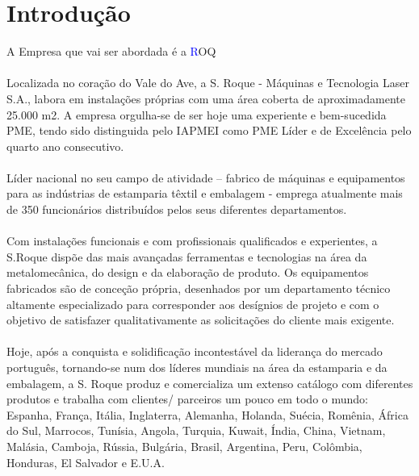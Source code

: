 \section{Introdução}
A Empresa que vai ser abordada é a {\textcolor{blue} ROQ}\\
\\
Localizada no coração do Vale do Ave, a S. Roque - Máquinas e Tecnologia Laser S.A., labora em instalações próprias com uma área coberta de aproximadamente 25.000 m2. A empresa orgulha-se de ser hoje uma experiente e bem-sucedida PME, tendo sido distinguida pelo IAPMEI como PME Líder e de Excelência pelo quarto ano consecutivo.\\\
\\
Líder nacional no seu campo de atividade – fabrico de máquinas e equipamentos para as indústrias de estamparia têxtil e embalagem - emprega atualmente mais de 350 funcionários distribuídos pelos seus diferentes departamentos.\\
\\
Com instalações funcionais e com profissionais qualificados e experientes, a S.Roque dispõe das mais avançadas ferramentas e tecnologias na área da metalomecânica, do design e da elaboração de produto. Os equipamentos fabricados são de conceção própria, desenhados por um departamento técnico altamente especializado para corresponder aos desígnios de projeto e com o objetivo de satisfazer qualitativamente as solicitações do cliente mais exigente.\\
\\
Hoje, após a conquista e solidificação incontestável da liderança do mercado português, tornando-se num dos líderes mundiais na área da estamparia e da embalagem, a S. Roque produz e comercializa um extenso catálogo com diferentes produtos e trabalha com clientes/ parceiros um pouco em todo o mundo: Espanha, França, Itália, Inglaterra, Alemanha, Holanda, Suécia, Romênia, África do Sul, Marrocos, Tunísia, Angola, Turquia, Kuwait, Índia, China, Vietnam, Malásia, Camboja, Rússia, Bulgária, Brasil, Argentina, Peru, Colômbia, Honduras, El Salvador e E.U.A.\\
\\
